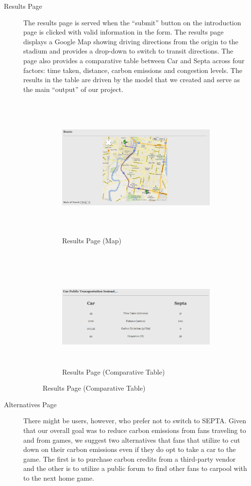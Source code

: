 \begin{description}
    \item[Results Page] The results page is served when the ``submit''
  button on the introduction page is clicked with valid information in
  the form. The results page displays a Google Map showing driving
  directions from the origin to the stadium and provides a drop-down
  to switch to transit directions. The page also provides a
  comparative table between Car and Septa across four factors: time
  taken, distance, carbon emissions and congestion levels. The results
  in the table are driven by the model that we created and serve as
  the main ``output'' of our project.
  \begin{figure}[htp]
    \centering
    \begin{subfigure}{14cm}
      \includegraphics[height=7.22cm]{graphics/website/results-map.png}
      \caption{Results Page (Map)}
    \end{subfigure} \\
    \begin{subfigure}{14cm}
      \includegraphics[height=5.24cm]{graphics/website/results-table.png}
      \caption{Results Page (Comparative Table)}
    \end{subfigure}
  \end{figure}

    \item[Alternatives Page] There might be users, however, who prefer
  not to switch to SEPTA. Given that our overall goal was to reduce
  carbon emissions from fans traveling to and from games, we suggest
  two alternatives that fans that utilize to cut down on their carbon
  emissions even if they do opt to take a car to the game. The first
  is to purchase carbon credits from a third-party vendor and the
  other is to utilize a public forum to find other fans to carpool
  with to the next home game.


\end{description}
